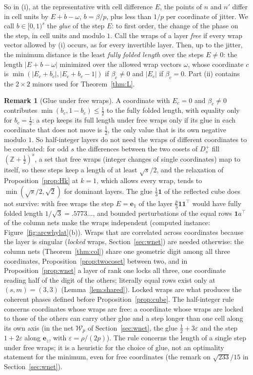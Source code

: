 \documentclass[11pt]{amsart}
\theoremstyle{definition}
\newtheorem{remark}[theorem]{Remark}
\theoremstyle{plain}
\newcommand{\Z}{\mathbb{Z}}
\newcommand{\e}{\mathbf{e}}
\begin{document}
So in (i), at the representative with cell difference $E$, the points of $n$ and $n'$ differ in cell units by $E+b-\omega$, $b=\beta/p$, plus less than $1/p$ per coordinate of jitter. We call $b\in[0,1)^s$ the \emph{glue} of the step $E$: to first order, the change of the phase on the step, in cell units and modulo $1$. Call the wraps of a layer \emph{free} if every wrap vector allowed by (i) occurs, as for every invertible layer. Then, up to the jitter, the minimum distance is the least \emph{fully folded length} over the steps $E\ne0$: the length $|E+b-\omega|$ minimized over the allowed wrap vectors $\omega$, whose coordinate $c$ is $\min(|E_c+b_c|,|E_c+b_c-1|)$ if $\beta_c\ne0$ and $|E_c|$ if $\beta_c=0$. Part (ii) contains the $2\times2$ minors used for Theorem~\ref{thm:L}.

\begin{remark}[Glue under free wraps]\label{rem:glue}
A coordinate with $E_c=0$ and $\beta_c\ne0$ contributes $\min(b_c,1-b_c)\le\frac12$ to the fully folded length, with equality only for $b_c=\frac12$: a step keeps its full length under free wraps only if its glue in each coordinate that does not move is $\frac12$, the only value that is its own negative modulo $1$. So half-integer layers do not need the wraps of different coordinates to be correlated: for odd $s$ the differences between the two cosets of $D_s^+$ fill $(\Z+\frac12)^s$, a set that free wraps (integer changes of single coordinates) map to itself, so these steps keep a length of at least $\sqrt s/2$, and the relaxation of Proposition~\ref{prop:Hk} at $k=1$, which allows every wrap, tends to $\min(\sqrt s/2,\sqrt2)$ for dominant layers. The glue $\frac13\mathbf 1$ of the reflected cube does not survive: with free wraps the step $E=\e_1$ of the layer $\frac p3\mathbf 1\mathbf 1^{\!\top}$ would have fully folded length $1/\sqrt3=.5773\ldots$, and bounded perturbations of the equal rows $\mathbf 1a^{\!\top}$ of the column nets make the wraps independent (computed instance: Figure~\ref{fig:arcwhylat}(b)). Wraps that are correlated across coordinates because the layer is singular (\emph{locked} wraps, Section~\ref{sec:wnet}) are needed otherwise: the column nets (Theorem~\ref{thm:col}) share one geometric digit among all three coordinates, Proposition~\ref{prop:twocoset} between two, and in Proposition~\ref{prop:wnet} a layer of rank one locks all three, one coordinate reading half of the digit of the others; literally equal rows exist only at $(s,m)=(3,3)$ (Lemma~\ref{lem:shared}). Locked wraps are what produces the coherent phases defined before Proposition~\ref{prop:cube}. The half-integer rule concerns coordinates whose wraps are free: a coordinate whose wraps are locked to those of the others can carry other glue and a step longer than one cell along its own axis (in the net $\mathcal W_p$ of Section~\ref{sec:wnet}, the glue $\frac12+3\varepsilon$ and the step $1+2\varepsilon$ along $\e_z$, with $\varepsilon=\rho/(2p)$). The rule concerns the length of a single step under free wraps; it is a heuristic for the choice of glue, not an optimality statement for the minimum, even for free coordinates (the remark on $\sqrt{233}/15$ in Section~\ref{sec:wnet}).
\end{remark}
\end{document}
